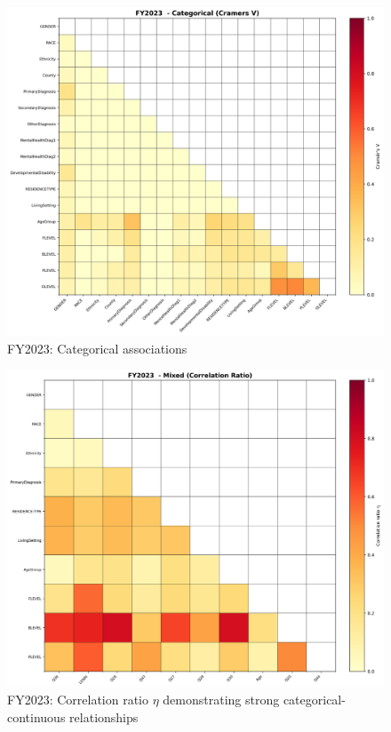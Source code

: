 \vspace*{\fill}
\begin{figure}[htbp]
\centering
\includegraphics[width=\textwidth]{fy2023_categorical_cramers_v.png}
\caption{FY2023: Categorical associations}
\end{figure}
\vspace*{\fill}

\newpage

\vspace*{\fill}
\begin{figure}[htbp]
\centering
\includegraphics[width=\textwidth]{fy2023_mixed_correlation_ratio.png}
\caption{FY2023: Correlation ratio $\eta$ demonstrating strong categorical-continuous relationships}
\end{figure}
\vspace*{\fill}


